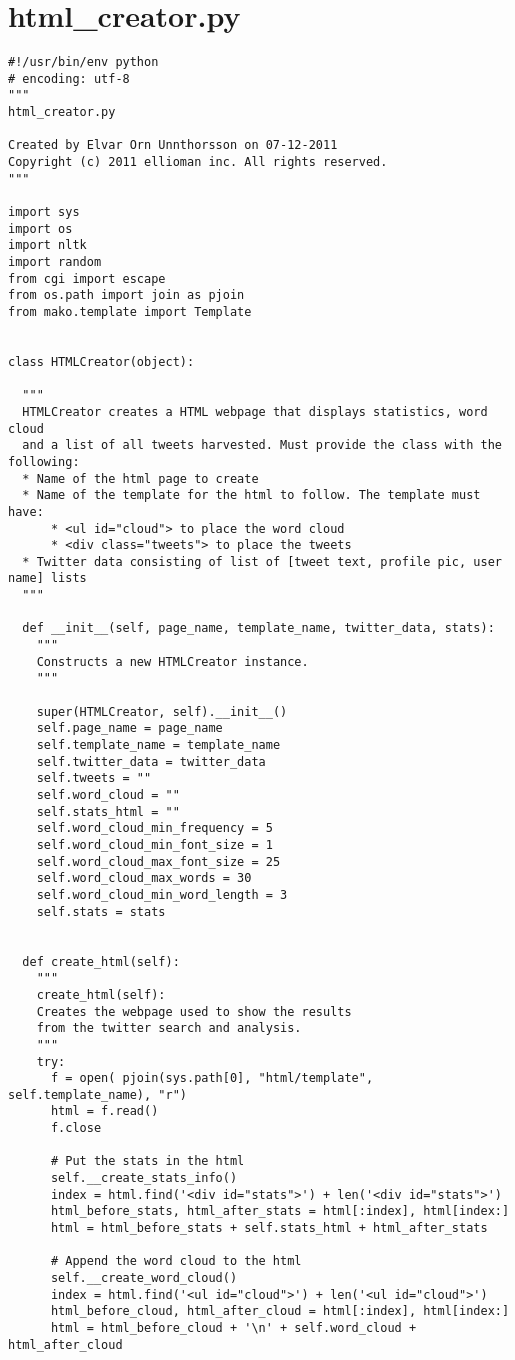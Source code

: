\section{html\_creator.py} \label{sec:HTMLCreator}
\begin{verbatim}
#!/usr/bin/env python
# encoding: utf-8
"""
html_creator.py

Created by Elvar Orn Unnthorsson on 07-12-2011
Copyright (c) 2011 ellioman inc. All rights reserved.
"""

import sys
import os
import nltk
import random
from cgi import escape
from os.path import join as pjoin
from mako.template import Template


class HTMLCreator(object):

  """
  HTMLCreator creates a HTML webpage that displays statistics, word cloud
  and a list of all tweets harvested. Must provide the class with the following:
  * Name of the html page to create
  * Name of the template for the html to follow. The template must have: 
      * <ul id="cloud"> to place the word cloud
      * <div class="tweets"> to place the tweets
  * Twitter data consisting of list of [tweet text, profile pic, user name] lists
  """

  def __init__(self, page_name, template_name, twitter_data, stats):
    """
    Constructs a new HTMLCreator instance.
    """

    super(HTMLCreator, self).__init__()
    self.page_name = page_name
    self.template_name = template_name
    self.twitter_data = twitter_data
    self.tweets = ""
    self.word_cloud = ""
    self.stats_html = ""
    self.word_cloud_min_frequency = 5
    self.word_cloud_min_font_size = 1
    self.word_cloud_max_font_size = 25
    self.word_cloud_max_words = 30
    self.word_cloud_min_word_length = 3
    self.stats = stats


  def create_html(self):
    """
    create_html(self):
    Creates the webpage used to show the results 
    from the twitter search and analysis.
    """
    try: 
      f = open( pjoin(sys.path[0], "html/template", self.template_name), "r")
      html = f.read()
      f.close

      # Put the stats in the html
      self.__create_stats_info()
      index = html.find('<div id="stats">') + len('<div id="stats">')
      html_before_stats, html_after_stats = html[:index], html[index:]
      html = html_before_stats + self.stats_html + html_after_stats

      # Append the word cloud to the html
      self.__create_word_cloud()
      index = html.find('<ul id="cloud">') + len('<ul id="cloud">')
      html_before_cloud, html_after_cloud = html[:index], html[index:]
      html = html_before_cloud + '\n' + self.word_cloud + html_after_cloud


\end{verbatim}
